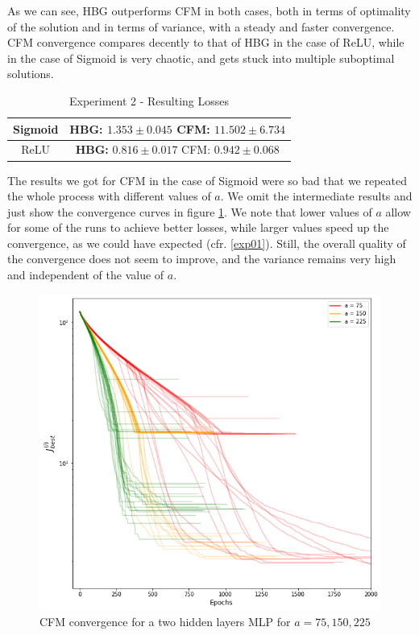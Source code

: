 As we can see, HBG outperforms CFM in both cases, both in terms of optimality of the solution and in terms of variance, with a steady and faster convergence. CFM convergence compares decently to that of HBG in the case of ReLU, while in the case of Sigmoid is very chaotic, and gets stuck into multiple suboptimal solutions.

\begin{table}[htbp]
    \centering
    \begin{tabular}{|c|c|}
        \hline
        Sigmoid & \makecell{\textbf{HBG:} $\mathbf{1.353 \pm 0.045}$ \\ CFM: $11.502 \pm 6.734$} \\
        \hline
        ReLU & \makecell{\textbf{HBG:} $\mathbf{0.816 \pm 0.017}$ \\ CFM: $0.942 \pm 0.068$} \\
        \hline
    \end{tabular}
    \caption{Experiment 2 - Resulting Losses}
    \label{tab:2_r}
\end{table}

The results we got for CFM in the case of Sigmoid were so bad that we repeated the whole process with different values of $a$. We omit the intermediate results and just show the convergence curves in figure \ref{fig:h2_sigmoid_a}. We note that lower values of $a$ allow for some of the runs to achieve better losses, while larger values speed up the convergence, as we could have expected (cfr. \ref{exp01}). Still, the overall quality of the convergence does not seem to improve, and the variance remains very high and independent of the value of $a$.

\begin{figure}[htbp]
    \centering
    \includegraphics[width=.6\textwidth]{images/h2_sigmoid_a.png}
    \caption{CFM convergence for a two hidden layers MLP for $a=75,150,225$}
    \label{fig:h2_sigmoid_a}
\end{figure}

